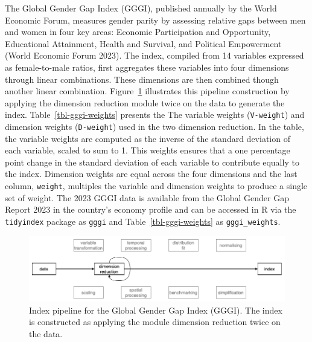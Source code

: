 \documentclass[
]{interact}
\begin{document}
The Global Gender Gap Index (GGGI), published annually by the World
Economic Forum, measures gender parity by assessing relative gaps
between men and women in four key areas: Economic Participation and
Opportunity, Educational Attainment, Health and Survival, and Political
Empowerment (World Economic Forum 2023). The index, compiled from 14
variables expressed as female-to-male ratios, first aggregates these
variables into four dimensions through linear combinations. These
dimensions are then combined though another linear combination.
Figure~\ref{fig-pp-gggi} illustrates this pipeline construction by
applying the dimension reduction module twice on the data to generate
the index. Table~\ref{tbl-gggi-weights} presents the The variable
weights (\texttt{V-weight}) and dimension weights (\texttt{D-weight})
used in the two dimension reduction. In the table, the variable weights
are computed as the inverse of the standard deviation of each variable,
scaled to sum to 1. This weights ensures that a one percentage point
change in the standard deviation of each variable to contribute equally
to the index. Dimension weights are equal across the four dimensions and
the last column, \texttt{weight}, multiples the variable and dimension
weights to produce a single set of weight. The 2023 GGGI data is
available from the Global Gender Gap Report 2023 in the country's
economy profile and can be accessed in R via the \texttt{tidyindex}
package as \texttt{gggi} and Table~\ref{tbl-gggi-weights} as
\texttt{gggi\_weights}.

\begin{figure}

{\centering \includegraphics[width=1\textwidth,height=0.9\textheight]{figures/pipeline-gggi.png}

}

\caption{\label{fig-pp-gggi}Index pipeline for the Global Gender Gap
Index (GGGI). The index is constructed as applying the module dimension
reduction twice on the data.}

\end{figure}
\end{document}
